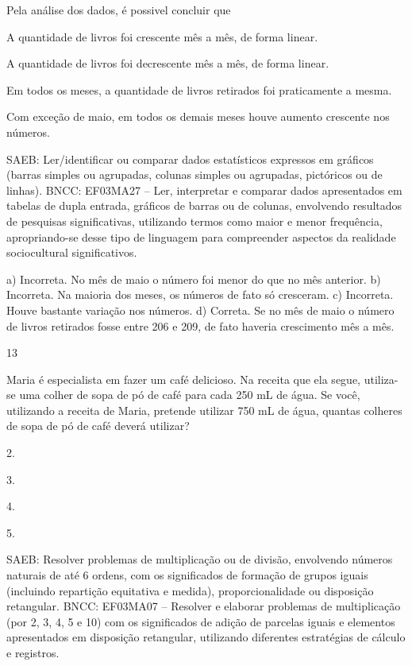 \begin{multicols}{2}
{\begin{escolha}
{Pela análise dos dados, é possivel concluir que

\begin{escolha}
\item
  A quantidade de livros foi crescente mês a mês, de forma linear.
\item
  A quantidade de livros foi decrescente mês a mês, de forma linear.
\item
  Em todos os meses, a quantidade de livros retirados foi praticamente a mesma.
\item
  Com exceção de maio, em todos os demais meses houve aumento crescente nos números.
\end{escolha}

SAEB: Ler/identificar ou comparar dados estatísticos
expressos em gráficos (barras simples ou agrupadas, colunas simples ou
agrupadas, pictóricos ou de linhas).
BNCC: EF03MA27 -- Ler, interpretar e comparar dados apresentados em tabelas de dupla entrada,
gráficos de barras ou de colunas, envolvendo resultados de pesquisas significativas, utilizando
termos como maior e menor frequência, apropriando-se desse tipo de linguagem para compreender aspectos da realidade sociocultural significativos.

a) Incorreta. No mês de maio o número foi menor do que no mês anterior.
b) Incorreta. Na maioria dos meses, os números de fato só cresceram.
c) Incorreta. Houve bastante variação nos números.
d) Correta. Se no mês de maio o número de livros retirados fosse entre 206 e 209, de fato haveria crescimento mês a mês.

\num{13}

Maria é especialista em fazer um café delicioso. Na receita que ela segue, utiliza-se uma colher de sopa de pó de café para cada 250 mL de água. Se você, utilizando a receita de Maria, pretende utilizar 750 mL de água, quantas colheres de sopa de pó de café deverá utilizar?

\begin{escolha}
\item
  2.
\item
  3.
\item
  4.
\item
  5.
\end{escolha}

SAEB: Resolver problemas de multiplicação ou de divisão, envolvendo números naturais de até 6 ordens, com os significados de formação de grupos iguais (incluindo repartição equitativa e medida), proporcionalidade ou disposição retangular.
BNCC: EF03MA07 – Resolver e elaborar problemas de multiplicação (por 2, 3, 4, 5 e 10) com os
significados de adição de parcelas iguais e elementos apresentados em disposição retangular,
utilizando diferentes estratégias de cálculo e registros.

}
\end{escolha}}
\end{multicols}
